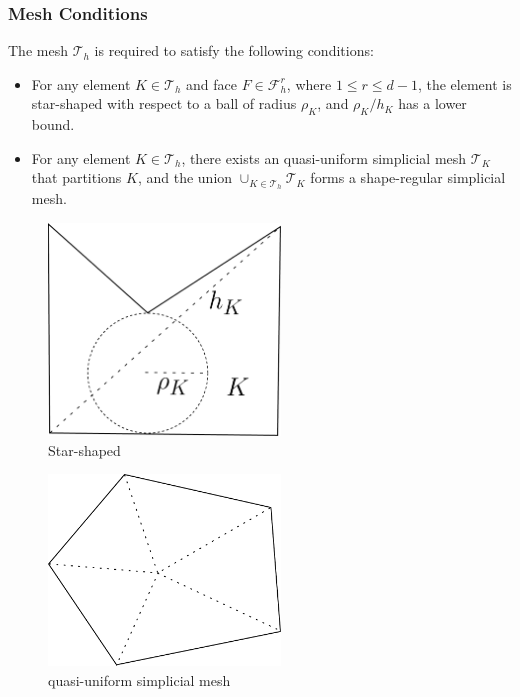 \documentclass[notheorems,serif]{beamer}
\begin{document}
\begin{CJK}{UTF8}{gkai}
\begin{frame}
  \frametitle{Mesh Conditions}
  The mesh $\mathcal{T}_h$ is required to satisfy the following conditions:
  \begin{itemize}
    \item For any element $K \in \mathcal{T}_h$ and face $F \in \mathcal{F}_h^r$,
        where $1 \leq r \leq d-1$, the element is star-shaped with respect to a ball of radius $\rho_K$, and
        $\rho_K / h_K$ has a lower bound.
    \item For any element $K \in \mathcal{T}_h$, there exists an quasi-uniform simplicial mesh
        $\mathcal{T}_K$ that partitions $K$, and the union $\cup_{K \in \mathcal{T}_h} \mathcal{T}_K$
        forms a shape-regular simplicial mesh.
  \end{itemize}
  \vspace{10pt}
\begin{minipage}[b]{0.49\linewidth}
    \begin{figure}[htpb]
      \centering
      \includegraphics[width=0.55\textwidth]{../figures/star-shaped.pdf}
      \caption{Star-shaped}
    \end{figure}
\end{minipage}
\hfill
\begin{minipage}[b]{0.49\linewidth}
    \centering
    \begin{figure}[htpb]
        \centering
        \includegraphics[width=0.55\textwidth]{../figures/splite_polygon.pdf}
        \caption{quasi-uniform simplicial mesh}
    \end{figure}
\end{minipage}


\end{frame}
\end{CJK}
\end{document}
